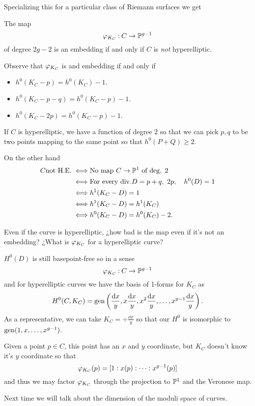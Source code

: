 \documentclass[12pt]{memoir}
\begin{document}
Specializing this for a particular class of Riemann surfaces we get 

\begin{Prop}
    The map 
    $$\varphi_{K_C}\mathbin{:} C\to\mathbb{P}^{g-1}$$
    of degree $2g-2$ is an embedding if and only if $C$ is \emph{not} hyperelliptic.
\end{Prop}

\begin{ptcbp}
    Observe that $\varphi_{K_C}$ is and embedding if and only if
    \begin{itemize}
        \item $h^0(K_C-p)=h^0(K_C)-1$.
        \item $h^0(K_C-p-q)=h^0(K_C-p)-1$.
        \item $h^0(K_C-2p)=h^0(K_C-p)-1$.
    \end{itemize}
    If $C$ is hyperelliptic, we have a function of degree $2$ so that we can pick $p,q$ to be two points mapping to the same point so that $h^0(P+Q)\geq 2$.\par
    On the other hand 
    \begin{align*}
        C\text{not H.E.}\iff&\text{No map }C\to\mathbb{P}^1\text{ of deg. 2}\\
        \iff&\text{For every div.}D=p+q,\ 2p,\quad h^0(D)=1\\
        \iff&h^1(K_C-D)=1\\
        \iff&h^1(K_C-D)=h^1(K_C)\\
        \iff&h^0(K_C-D)=h^0(K_C)-2.
    \end{align*}
\end{ptcbp}

Even if the curve is hyperelliptic, ¿how bad is the map even if it's not an embedding? ¿What is $\varphi_{K_C}$ for a hyperelliptic curve?\par
$H^0(D)$ is still basepoint-free so in a sense 
$$\varphi_{K_C}\mathbin{:} C\to\mathbb{P}^{g-1}$$
and for hyperelliptic curves we have the basis of 1-forms for $K_C$ as
$$H^0(C,K_C)=\operatorname{gen}\left(\frac{\dd x}{y},x\frac{\dd x}{y},x^2\frac{\dd x}{y},\dots,x^{g-1}\frac{\dd x}{y}\right).$$
As a representative, we can take $K_C=\div\frac{\dd x}{y}$ so that our $H^0$ is isomorphic to $\operatorname{gen}(1,x,\dots,x^{g-1})$.\par
Given a point $p\in C$, this point has an $x$ and $y$ coordinate, but $K_C$ doesn't know it's $y$ coordinate so that 
$$\varphi_{K_C}(p)=[1:x(p):\dots:x^{g-1}(p)]$$
and thus we may factor $\varphi_{K_C}$ through the projection to $\mathbb{P}^1$ and the Veronese map.\par
Next time we will talk about the dimension of the moduli space of curves. 
\end{document}
